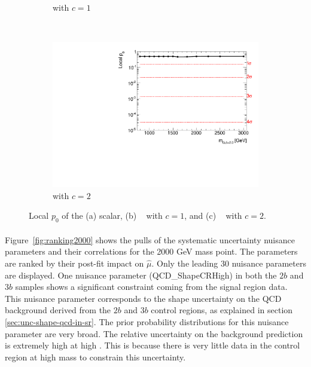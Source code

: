 \begin{figure}[htb!]
\begin{subfigure}[b]{0.35\textwidth}
        \caption{\Grav with $c=1$}
        \label{fig:localp0-g1}
    \end{subfigure}
    \\
    \hspace{-2.5cm}
    \begin{subfigure}[b]{0.35\textwidth}
        \includegraphics[width=\textwidth,angle=-90]{figures/boosted/results/p0_g20_allmasses_boosted.pdf}
        \caption{\Grav with $c=2$}
        \label{fig:localp0-g2}
    \end{subfigure}
  \caption{Local $p_0$ of the (a) scalar, (b) \Grav~ with $c=1$,  and (c) \Grav~ with $c=2$.}
  \label{fig:localp0}
\end{figure}

\paragraph{}
Figure~\ref{fig:ranking2000} shows the pulls of the systematic uncertainty nuisance parameters and their correlations for the 2000 GeV mass point. 
The parameters are ranked by their post-fit impact on $\hat{\mu}$. 
Only the leading 30 nuisance parameters are displayed.
One nuisance parameter (QCD\_ShapeCRHigh) in both the $2b$ and $3b$ samples shows a significant constraint coming from the signal region data. 
This nuisance parameter corresponds to the shape uncertainty on the QCD background derived from the $2b$ and $3b$ control regions, as explained in section \ref{sec:unc-shape-qcd-in-sr}. 
The prior probability distributions for this nuisance parameter are very broad.
The relative uncertainty on the background prediction is extremely high at high \mtwoJ. 
This is because there is very little data in the control region at high mass to constrain this uncertainty.

